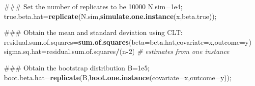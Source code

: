 \documentclass[12pt,]{book}
\newenvironment{Shaded}{\begin{snugshade}}{\end{snugshade}}
\newcommand{\KeywordTok}[1]{\textcolor[rgb]{0.13,0.29,0.53}{\textbf{#1}}}
\newcommand{\DataTypeTok}[1]{\textcolor[rgb]{0.13,0.29,0.53}{#1}}
\newcommand{\DecValTok}[1]{\textcolor[rgb]{0.00,0.00,0.81}{#1}}
\newcommand{\FloatTok}[1]{\textcolor[rgb]{0.00,0.00,0.81}{#1}}
\newcommand{\CommentTok}[1]{\textcolor[rgb]{0.56,0.35,0.01}{\textit{#1}}}
\newcommand{\OperatorTok}[1]{\textcolor[rgb]{0.81,0.36,0.00}{\textbf{#1}}}
\newcommand{\NormalTok}[1]{#1}
\begin{document}
\begin{Shaded}
\begin{Highlighting}[]
\NormalTok{### Set the number of replicates to be 10000}
\NormalTok{N.sim=}\FloatTok{1e4}\NormalTok{;}
\NormalTok{true.beta.hat=}\KeywordTok{replicate}\NormalTok{(N.sim,}\KeywordTok{simulate.one.instance}\NormalTok{(x,beta.true));}

\NormalTok{### Obtain the mean and standard deviation using CLT:}
\NormalTok{residual.sum.of.squares=}\KeywordTok{sum.of.squares}\NormalTok{(}\DataTypeTok{beta=}\NormalTok{beta.hat,}\DataTypeTok{covariate=}\NormalTok{x,}\DataTypeTok{outcome=}\NormalTok{y)}
\NormalTok{sigma.sq.hat=residual.sum.of.squares}\OperatorTok{/}\NormalTok{(n}\OperatorTok{-}\DecValTok{2}\NormalTok{) }\CommentTok{# estimates from one instance}

  
\NormalTok{### Obtain the bootstrap distribution }
\NormalTok{B=}\FloatTok{1e5}\NormalTok{;}
\NormalTok{boot.beta.hat=}\KeywordTok{replicate}\NormalTok{(B,}\KeywordTok{boot.one.instance}\NormalTok{(}\DataTypeTok{covariate=}\NormalTok{x,}\DataTypeTok{outcome=}\NormalTok{y));}
\end{Highlighting}
\end{Shaded}
\end{document}
